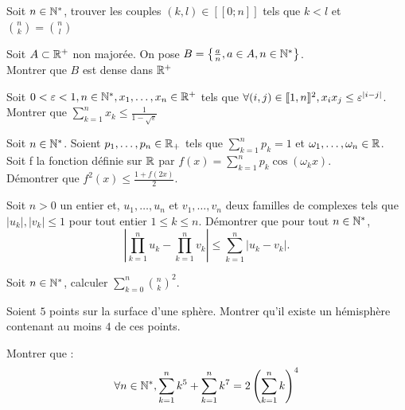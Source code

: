 \begin{exercise}
Soit $n\in\mathbb{N}^*$, trouver les couples $(k,l)\in[\![0;n]\!]$ tels que $k\lt l$ et $\binom{n}{k}=\binom{n}{l}$
\end{exercise}

\begin{exercise}
Soit $A\subset\mathbb{R}^+$ non majorée. On pose $B=\left\{\frac{a}{n},a\in A, n\in\mathbb{N}^*\right\}$.\\
Montrer que $B$ est dense dans $\mathbb{R}^+$
\end{exercise}

\begin{exercise}
Soit $0<\varepsilon<1, n\in\mathbb{N}^*, x_1,\ldots,x_n\in\mathbb{R}^+$ tels que $\forall (i,j)\in[\![1,n]\!]^2, x_ix_j\leq\varepsilon^{\left|i-j\right|}$.\\
Montrer que $\displaystyle\sum_{k=1}^nx_k\leq \frac{1}{1-\sqrt{\varepsilon}}$
\end{exercise}

\begin{exercise}
Soit $n\in\mathbb{N}^*$.
Soient $p_1,\ldots,p_n\in\mathbb{R}_+$ tels que
$\displaystyle\sum_{k=1}^np_k=1$
et $\omega_1,\ldots,\omega_n\in\mathbb{R}$. \\
Soit f la fonction définie sur $\mathbb{R}$ par
$f(x)=\displaystyle\sum_{k=1}^np_k\cos{(\omega_kx)}$.\\
Démontrer que
$f^2(x)\le\frac{1+f(2x)}{2}$.
\end{exercise}

\begin{exercise}
Soit $n>0$ un entier et, $u_1,\ldots,u_n$ et $v_1,\ldots,v_n$ deux familles de complexes tels que $|u_k|,|v_k|\le1$ pour tout entier $1\le k\le n$. Démontrer que pour tout $n\in\mathbb{N}^*$,
\[\left|\prod_{k=1}^nu_k-\prod_{k=1}^nv_k\right|\le\sum_{k=1}^n|u_k-v_k|.\]
\end{exercise}

\begin{exercise}
Soit $n\in\mathbb{N}^*$, calculer $\displaystyle\sum_{k=0}^n\binom{n}{k}^2$.
\end{exercise}

\begin{exercise}
Soient $5$ points sur la surface d'une sphère. Montrer qu'il existe un hémisphère contenant au moins $4$ de ces points.
\end{exercise}

\begin{exercise}
Montrer que :\\
$$\forall n\in\mathbb{N}^*, \sum_{k=1}^nk^5+\sum_{k=1}^nk^7=2\left(\sum_{k=1}^nk\right)^4$$
\end{exercise}

